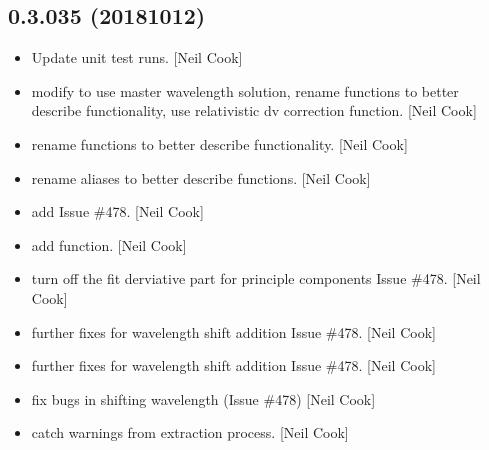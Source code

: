 \documentclass[a4paper,10pt,english]{report}
\begin{document}
\subsection{0.3.035 (2018\sphinxhyphen{}10\sphinxhyphen{}12)}
\label{\detokenize{misc/changelog:id316}}\begin{itemize}
\item {} 
Update unit test runs. {[}Neil Cook{]}

\item {} 
 \sphinxhyphen{} modify  to use master
wavelength solution, rename functions to better describe
functionality, use relativistic dv correction function. {[}Neil Cook{]}

\item {} 
 \sphinxhyphen{} rename functions to better describe functionality.
{[}Neil Cook{]}

\item {} 
 \sphinxhyphen{} rename aliases to better describe functions.
{[}Neil Cook{]}

\item {} 
 \sphinxhyphen{} add  \sphinxhyphen{} Issue \#478. {[}Neil
Cook{]}

\item {} 
 \sphinxhyphen{} add  function. {[}Neil Cook{]}

\item {} 
 \sphinxhyphen{} turn off the fit derviative part for
principle components \sphinxhyphen{} Issue \#478. {[}Neil Cook{]}

\item {} 
 \sphinxhyphen{} further fixes for wavelength shift addition \sphinxhyphen{}
Issue \#478. {[}Neil Cook{]}

\item {} 
 \sphinxhyphen{} further fixes for wavelength shift addition \sphinxhyphen{} Issue
\#478. {[}Neil Cook{]}

\item {} 
 \sphinxhyphen{} fix bugs in shifting wavelength (Issue \#478) {[}Neil
Cook{]}

\item {} 
 \sphinxhyphen{} catch warnings from extraction process.
{[}Neil Cook{]}


\end{itemize}
\end{document}
